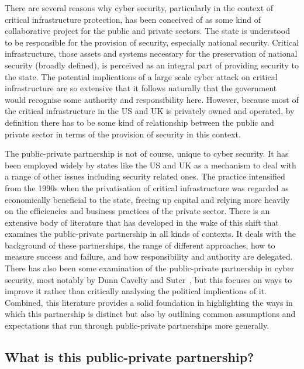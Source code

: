 \documentclass[a4paper,11pt]{article}
\begin{document}
There are several reasons why cyber security, particularly in the
context of critical infrastructure protection, has been conceived of
as some kind of collaborative project for the public and private
sectors. The state is understood to be responsible for the provision
of security, especially national security. Critical infrastructure,
those assets and systems necessary for the preservation of national
security (broadly defined), is perceived as an integral part of
providing security to the state. The potential implications of a large
scale cyber attack on critical infrastructure are so extensive that it
follows naturally that the government would recognise some authority
and responsibility here. However, because most of the critical
infrastructure in the US and UK is privately owned and operated, by
definition there has to be some kind of relationship between the
public and private sector in terms of the provision of security in
this context. 

The public-private partnership is not of course, unique to cyber
security. It has been employed widely by states like the US and UK as
a mechanism to deal with a range of other issues including security
related ones. The practice intensified from the 1990s when the
privatisation of critical infrastructure was regarded as economically
beneficial to the state, freeing up capital and relying more heavily
on the efficiencies and business practices of the private
sector. There is an extensive body of literature that has developed in
the wake of this shift that examines the public-private partnership in
all kinds of contexts. It deals with the background of these
partnerships, the range of different approaches, how to measure
success and failure, and how responsibility and authority are
delegated. There has also been some examination of the public-private
partnership in cyber security, most notably by Dunn Cavelty and
Suter~\cite{dunncavelty+suter:2009}, but this focuses on ways to
improve it rather than critically analysing the political implications
of it. Combined, this literature provides a solid foundation in
highlighting the ways in which this partnership is distinct but also
by outlining common assumptions and expectations that run through
public-private partnerships more generally.

\subsection{What is this public-private partnership?}
\end{document}
